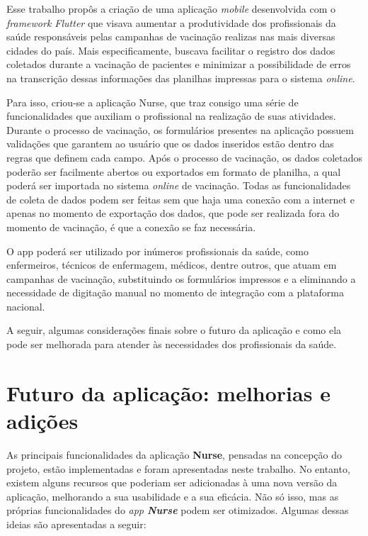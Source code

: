 
\label{Cap:Conclusao}
Esse trabalho propôs a criação de uma aplicação \textit{mobile} desenvolvida com o \textit{framework Flutter} que visava aumentar a produtividade dos profissionais da saúde responsáveis pelas campanhas de vacinação realizas nas mais diversas cidades do país. Mais especificamente, buscava facilitar o registro dos dados coletados durante a vacinação de pacientes e minimizar a possibilidade de erros na transcrição dessas informações das planilhas impressas para o sistema \textit{online}.

Para isso, criou-se a aplicação Nurse, que traz consigo uma série de funcionalidades que auxiliam o profissional na realização de suas atividades. Durante o processo de vacinação, os formulários presentes na aplicação possuem validações que garantem ao usuário que os dados inseridos estão dentro das regras que definem cada campo. Após o processo de vacinação, os dados coletados poderão ser facilmente abertos ou exportados em formato de planilha, a qual poderá ser importada no sistema \textit{online} de vacinação. Todas as funcionalidades de coleta de dados podem ser feitas sem que haja uma conexão com a internet e apenas no momento de exportação dos dados, que pode ser realizada fora do momento de vacinação, é que a conexão se faz necessária.

O app poderá ser utilizado por inúmeros profissionais da saúde, como enfermeiros, técnicos de enfermagem, médicos, dentre outros, que atuam em campanhas de vacinação, substituindo os formulários impressos e a eliminando a necessidade de digitação manual no momento de integração com a plataforma nacional.

A seguir, algumas considerações finais sobre o futuro da aplicação e como ela pode ser melhorada para atender às necessidades dos profissionais da saúde.

\section{Futuro da aplicação: melhorias e adições}
\label{Sec:FuturoNurse}
As principais funcionalidades da aplicação \textbf{Nurse}, pensadas na concepção do projeto, estão implementadas e foram apresentadas neste trabalho. No entanto, existem alguns recursos que poderiam ser adicionadas à uma nova versão da aplicação, melhorando a sua usabilidade e a sua eficácia. Não só isso, mas as próprias funcionalidades do \textit{app \textbf{Nurse}} podem ser otimizados. Algumas dessas ideias são apresentadas a seguir:

